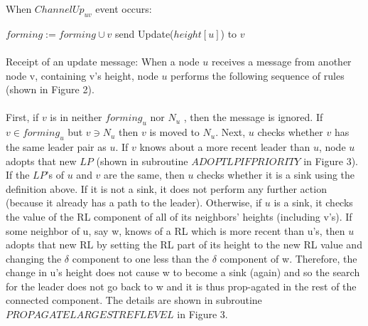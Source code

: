 \begin{algorithm}
	\caption{When $ChannelUp_{uv}$ event occurs:}
	\begin{algorithmic}[1]
		
	\State $forming := forming \cup {v}$
	\State send Update($height[u]$) to $v$
		
	\end{algorithmic}
\end{algorithm}

\paragraph{}Receipt of an update message: When a node $u$ receives a message from another node v, containing v’s height, node $u$ performs the following sequence of rules (shown in Figure 2).
\paragraph{}First, if $v$ is in neither $forming_u$ nor $N_u$ , then the message is ignored. If $v \in forming_u$ but $v \ni N_u$ then $v$ is moved to $N_u$. Next, $u$ checks whether $v$ has the same leader pair as $u$. If $v$ knows about a more recent leader than $u$, node $u$ adopts that new $LP$ (shown in subroutine $ADOPTLPIFPRIORITY$ in Figure 3). If the $LP$’s of $u$ and $v$ are the same, then $u$ checks whether it is a sink using the definition above. If it is not a sink, it does not perform any further action (because it already has a path to the leader). Otherwise, if $u$ is a sink, it checks the value of the RL component of all of its neighbors’ heights (including v’s). If some neighbor of u, say w, knows of a RL which is more recent than u’s, then $u$ adopts that new RL by setting the RL part of its height to the new RL value and changing the $\delta$ component to one less than the $\delta$ component of w. Therefore, the change in u’s height does not cause w to become a sink (again) and so the search for the leader does not go back to w and it is thus prop-agated in the rest of the connected component. The details are shown in subroutine $PROPAGATELARGESTREFLEVEL$ in Figure 3.
